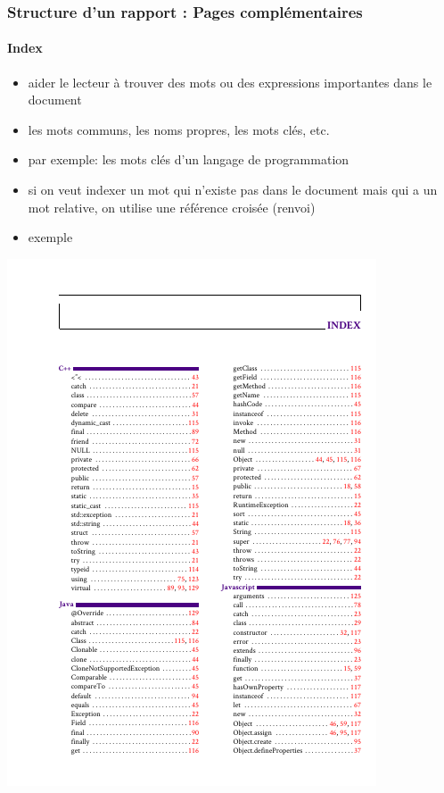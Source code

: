\documentclass[xcolor=table]{beamer}
\begin{document}
\begin{frame}
\frametitle{Structure d'un rapport : Pages complémentaires}
\framesubtitle{Index}

\begin{minipage}{0.52\textwidth}
	\begin{itemize}
		\item aider le lecteur à trouver des mots ou des expressions importantes dans le document
		\item les mots communs, les noms propres, les mots clés, etc. 
		\item par exemple: les mots clés d'un langage de programmation 
		\item si on veut indexer un mot qui n'existe pas dans le document mais qui a un mot relative, on utilise une référence croisée (renvoi) 
		\item exemple 
	\end{itemize}
\end{minipage}
\begin{minipage}{0.42\textwidth}
	\includegraphics[width=\textwidth]{..//img/Bweb03-redaction/index.png}
\end{minipage}

\end{frame}
\end{document}

